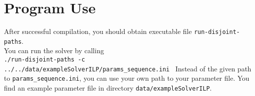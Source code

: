 \documentclass[a4paper,10pt]{article}
\begin{document}
\section{Program Use}\label{sec:programUse}
 

After successful compilation, you should obtain executable file \texttt{run-disjoint-paths}.\\
You can run the solver by calling\\
 \texttt{./run-disjoint-paths -c ../../data/exampleSolverILP/params\_sequence.ini } 
 Instead of the given path to \texttt{params\_sequence.ini}, you can use your own path to your parameter file. You find an example parameter file in directory \texttt{data/exampleSolverILP}.

\end{document}
